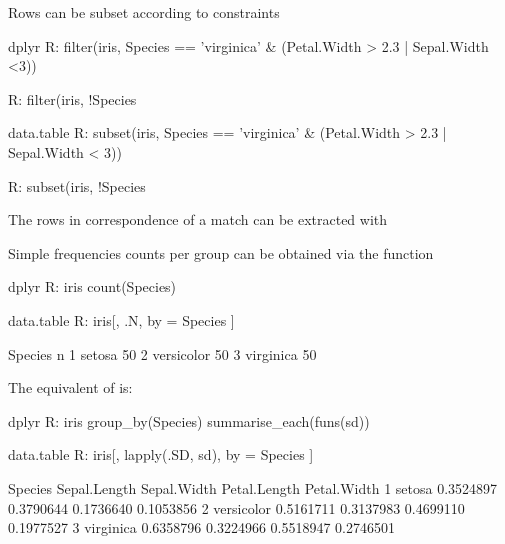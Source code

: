Rows can be subset according to constraints
\begin{example}
		dplyr
R: filter(iris, 
       Species == 'virginica'
       & (Petal.Width > 2.3 | Sepal.Width <3))

R: filter(iris,
          !Species %
       
		data.table
R: subset(iris, 
       Species == 'virginica'
       & (Petal.Width > 2.3 | Sepal.Width < 3)) 
       
R: subset(iris,
          !Species %
\end{example}
The rows in correspondence of a match
can be extracted with

Simple frequencies counts per group can be obtained 
via the  function
\begin{example}
		dplyr
R: iris %
     count(Species) 

		data.table
R: iris[, 
        .N,
        by = Species
        ]

     Species  n
1     setosa 50
2 versicolor 50
3  virginica 50
\end{example}
The equivalent of  is:
\begin{example}
		dplyr
R: iris %
     group_by(Species) %
       summarise_each(funs(sd))
 
		data.table
R: iris[,
	lapply(.SD, sd),
	by = Species
	]

     Species Sepal.Length Sepal.Width Petal.Length Petal.Width
1     setosa    0.3524897   0.3790644    0.1736640   0.1053856
2 versicolor    0.5161711   0.3137983    0.4699110   0.1977527
3  virginica    0.6358796   0.3224966    0.5518947   0.2746501
\end{example}

